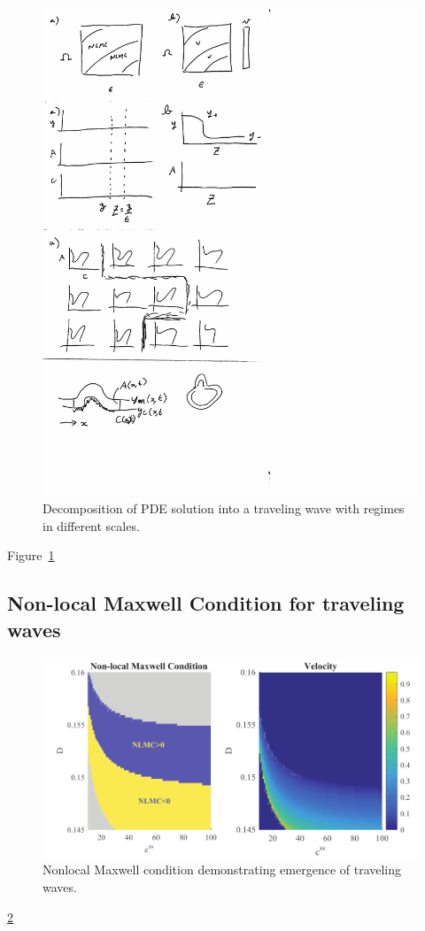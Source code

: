 \begin{figure}[htbp]
  \centering
  \label{fig:multiscaleRegimes}\includegraphics[width=13cm]{figs/figMultiscaleRegimes.pdf}
  \caption{Decomposition of PDE solution into a traveling wave with regimes in different scales.}
\end{figure}
Figure~\ref{fig:multiscaleRegimes}


\subsection{Non-local Maxwell Condition for traveling waves}

\begin{figure}[htbp]
  \centering
  \label{fig:NLMC}\includegraphics[width=13cm]{figs/NLMC1.pdf}
  \caption{Nonlocal Maxwell condition demonstrating emergence of traveling waves.}
\end{figure}
\ref{fig:NLMC}
